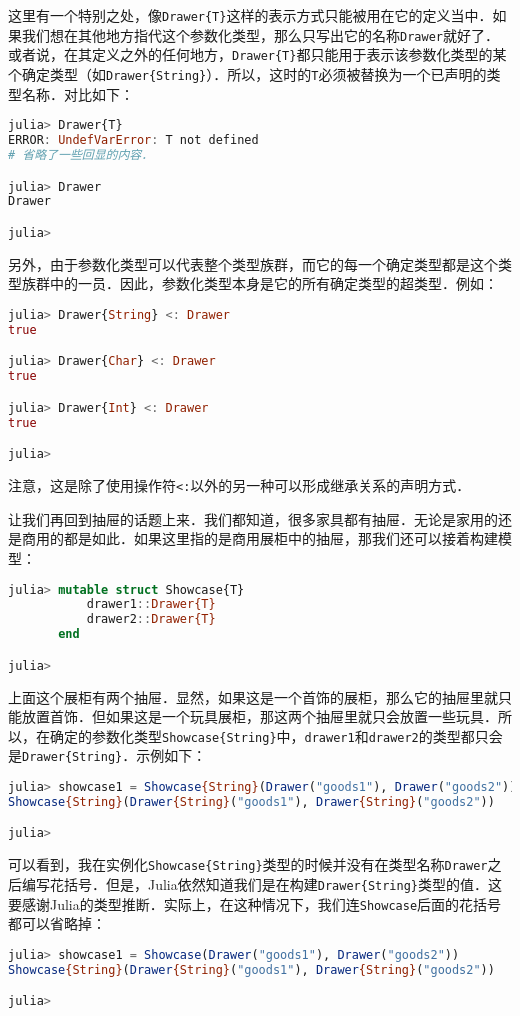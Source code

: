 这里有一个特别之处，像\verb|Drawer{T}|这样的表示方式只能被用在它的定义当中．如果我们想在其他地方指代这个参数化类型，那么只写出它的名称\verb|Drawer|就好了．或者说，在其定义之外的任何地方，\verb|Drawer{T}|都只能用于表示该参数化类型的某个确定类型（如\verb|Drawer{String}|）．所以，这时的\verb|T|必须被替换为一个已声明的类型名称．对比如下：
\begin{lstlisting}[language=julia]
julia> Drawer{T} 
ERROR: UndefVarError: T not defined
# 省略了一些回显的内容．

julia> Drawer
Drawer

julia> 
\end{lstlisting}

另外，由于参数化类型可以代表整个类型族群，而它的每一个确定类型都是这个类型族群中的一员．因此，参数化类型本身是它的所有确定类型的超类型．例如：
\begin{lstlisting}[language=julia]
julia> Drawer{String} <: Drawer
true

julia> Drawer{Char} <: Drawer
true

julia> Drawer{Int} <: Drawer
true

julia> 
\end{lstlisting}

注意，这是除了使用操作符\verb|<:|以外的另一种可以形成继承关系的声明方式．

让我们再回到抽屉的话题上来．我们都知道，很多家具都有抽屉．无论是家用的还是商用的都是如此．如果这里指的是商用展柜中的抽屉，那我们还可以接着构建模型：
\begin{lstlisting}[language=julia]
julia> mutable struct Showcase{T}
           drawer1::Drawer{T}
           drawer2::Drawer{T}
       end

julia> 
\end{lstlisting}

上面这个展柜有两个抽屉．显然，如果这是一个首饰的展柜，那么它的抽屉里就只能放置首饰．但如果这是一个玩具展柜，那这两个抽屉里就只会放置一些玩具．所以，在确定的参数化类型\verb|Showcase{String}|中，\verb|drawer1|和\verb|drawer2|的类型都只会是\verb|Drawer{String}|．示例如下：
\begin{lstlisting}[language=julia]
julia> showcase1 = Showcase{String}(Drawer("goods1"), Drawer("goods2"))
Showcase{String}(Drawer{String}("goods1"), Drawer{String}("goods2"))

julia> 
\end{lstlisting}

可以看到，我在实例化\verb|Showcase{String}|类型的时候并没有在类型名称\verb|Drawer|之后编写花括号．但是，Julia依然知道我们是在构建\verb|Drawer{String}|类型的值．这要感谢Julia的类型推断．实际上，在这种情况下，我们连\verb|Showcase|后面的花括号都可以省略掉：
\begin{lstlisting}[language=julia]
julia> showcase1 = Showcase(Drawer("goods1"), Drawer("goods2"))
Showcase{String}(Drawer{String}("goods1"), Drawer{String}("goods2"))

julia> 
\end{lstlisting}


